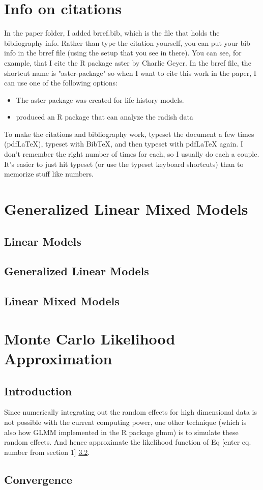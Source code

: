 \documentclass{article}
\begin{document}
\section{Info on citations}
In the paper folder, I added brref.bib, which is the file that holds the bibliography info. Rather than  type the citation yourself, you can put your bib info in the brref file (using the setup that you see in there). You can see, for example, that I cite the R package aster by Charlie Geyer. In the brref file, the shortcut name is "aster-package" so when I want to cite this work in the paper, I can use one of the following options:
\begin{itemize}
\item The aster package \citep{aster-package} was created for life history models.
\item  \citet{aster-package} produced an R package that can analyze the radish data 
\end{itemize}

To make the citations and bibliography work, typeset the document a few times (pdfLaTeX), typeset with BibTeX, and then typeset with pdfLaTeX again. I don't remember the right number of times for each, so I usually do each a couple. It's easier to just hit typeset (or use the typeset keyboard shortcuts) than to memorize stuff like numbers. 

\section{Generalized Linear Mixed Models}

\subsection{Linear Models}
\subsection{Generalized Linear Models}
\subsection{Linear Mixed Models}

\section{Monte Carlo Likelihood Approximation}
\subsection{Introduction}
Since numerically integrating out the random effects for high dimensional data is not possible with the current computing power, one other technique (which is also how GLMM implemented in the R package glmm) is to simulate these random effects.
And hence approximate the likelihood function of Eq [enter eq. number from section 1] \ref{}.

\subsection{Convergence}




\end{document}
